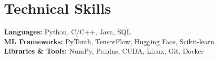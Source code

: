 \documentclass[10pt,letterpaper]{article}
\newcommand{\headingsimple}[2]{%
  \noindent\textbf{#1} \hfill #2\par
}
\begin{document}

\section{Technical Skills}
\textbf{Languages:} Python, C/C++, Java, SQL\\
\textbf{ML Frameworks:} PyTorch, TensorFlow, Hugging Face, Scikit-learn\\
\textbf{Libraries \& Tools:} NumPy, Pandas, CUDA, Linux, Git, Docker
\end{document}
